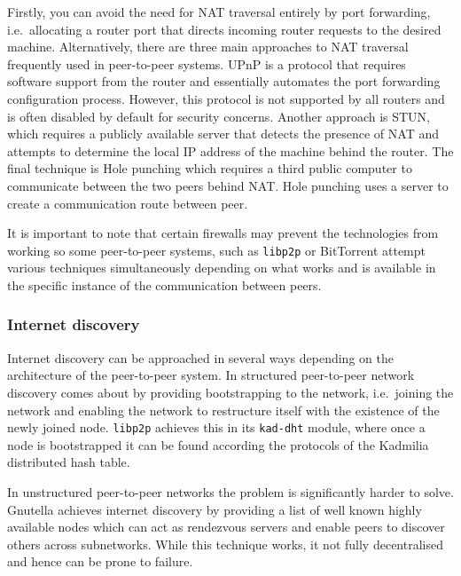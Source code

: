 Firstly, you can avoid the need for NAT traversal entirely by port forwarding, i.e.\ allocating a router port that directs incoming router requests to the desired machine. Alternatively, there are three main approaches to NAT traversal frequently used in peer-to-peer systems. UPnP is a protocol that requires software support from the router and essentially automates the port forwarding configuration process\cite{lee2007upnp}. However, this protocol is not supported by all routers and is often disabled by default for security concerns\cite{kayas2020upnp}. Another approach is STUN, which requires a publicly available server that detects the presence of NAT and attempts to determine the local IP address of the machine behind the router\cite{rosenberg2008stun}. The final technique is Hole punching which requires a third public computer to communicate between the two peers behind NAT\cite{maier2011holePunching}. Hole punching uses a server to create a communication route between peer.

It is important to note that certain firewalls may prevent the technologies from working so some peer-to-peer systems, such as \verb+libp2p+ or BitTorrent attempt various techniques simultaneously depending on what works and is available in the specific instance of the communication between peers.

\subsubsection{Internet discovery}

Internet discovery can be approached in several ways depending on the architecture of the peer-to-peer system. In structured peer-to-peer network discovery comes about by providing bootstrapping to the network, i.e.\ joining the network and enabling the network to restructure itself with the existence of the newly joined node. \verb+libp2p+ achieves this in its \verb+kad-dht+ module, where once a node is bootstrapped it can be found according the protocols of the Kadmilia distributed hash table\cite{maymounkov2002kadmilia}.

In unstructured peer-to-peer networks the problem is significantly harder to solve. Gnutella achieves internet discovery by providing a list of well known highly available nodes which can act as rendezvous servers and enable peers to discover others across subnetworks. While this technique works, it not fully decentralised and hence can be prone to failure.

